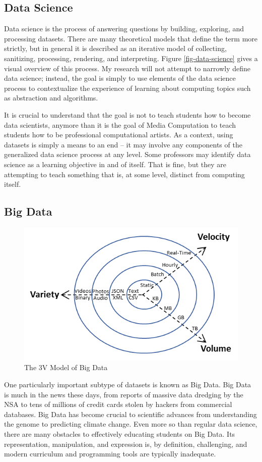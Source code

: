 \subsection{Data Science}

Data science is the process of answering questions by building, exploring, and processing datasets.
There are many theoretical models that define the term more strictly, but in general it is described as an iterative model of collecting, sanitizing, processing, rendering, and interpreting.
Figure \ref{fig-data-science} gives a visual overview of this process.
My research will not attempt to narrowly define data science; instead, the goal is simply to use elements of the data science process to contextualize the experience of learning about computing topics such as abstraction and algorithms.

It is crucial to understand that the goal is not to teach students how to become data scientists, anymore than it is the goal of Media Computation to teach students how to be professional computational artists.
As a context, using datasets is simply a means to an end -- it may involve any components of the generalized data science process at any level.
Some professors may identify data science as a learning objective in and of itself. That is fine, but they are attempting to teach something that is, at some level, distinct from computing itself.

\subsection{Big Data}

\begin{figure}
    \begin{center}
    \includegraphics[width=.5\linewidth]{images/3v-model.png}
    \end{center}
    \caption{The 3V Model of Big Data}
    \label{fig-3v}
\end{figure}

One particularly important subtype of datasets is known as Big Data. Big Data is much in the news these days, from reports of massive data
dredging by the NSA to tens of millions of credit cards stolen by
hackers from commercial databases.
Big Data has become crucial to scientific advances from understanding the genome to predicting climate change.
Even more so than regular data science, there are many obstacles to effectively educating students on Big Data.
Its representation, manipulation, and expression is, by definition, challenging, and modern curriculum and programming tools are typically inadequate.

